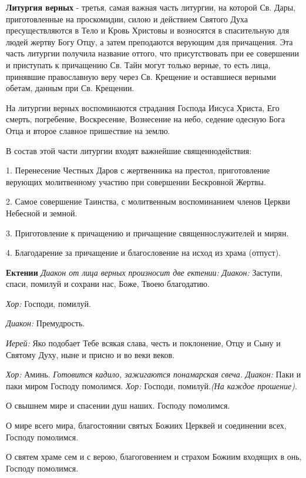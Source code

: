 {\bfseries Литургия верных} - третья, самая важная часть литургии, на которой Св. Дары, приготовленные на проскомидии, силою и действием Святого Духа пресуществляются в Тело и Кровь Христовы и возносятся в спасительную для людей жертву Богу Отцу, а затем преподаются верующим для причащения. Эта часть литургии получила название оттого, что присутствовать при ее совершении и приступать к причащению Св. Тайн могут только верные, то есть лица, принявшие православную веру через Св. Крещение и оставшиеся верными обетам, данным при Св. Крещении.

  На литургии верных воспоминаются страдания Господа Иисуса Христа, Его смерть, погребение, Воскресение, Вознесение на небо, седение одесную Бога Отца и второе славное пришествие на землю.

В состав этой части литургии входят важнейшие священнодействия:

  1. Перенесение Честных Даров с жертвенника на престол, приготовление верующих молитвенному участию при совершении Бескровной Жертвы.

  2. Самое совершение Таинства, с молитвенным воспоминанием членов Церкви Небесной и земной. 

  3. Приготовление к причащению и причащение священнослужителей и мирян.

  4. Благодарение за причащение и благословение на исход из храма (отпуст).

 {\bfseries Ектении}
{\itshape Диакон от лица верных произносит две ектении:}
 {\itshape  Диакон:} Заступи, спаси, помилуй и сохрани нас, Боже, Твоею благодатию.

{\itshape Хор:} Господи, помилуй.

{\itshape Диакон:} Премудрость.

{\itshape  Иерей:} Яко подобает Тебе всякая слава, честь и поклонение, Отцу и Сыну и Святому Духу, ныне и присно и во веки веков.

{\itshape  Хор:} Аминь.
{\itshape  Готовится кадило, зажигаются понамарская свеча.}
 {\itshape  Диакон:} Паки и паки миром Господу помолимся. 
{\itshape  
  Хор:} Господи, помилуй.{\itshape  (На каждое прошение)}. 

  О свышнем мире и спасении душ наших. Господу помолимся. 

  О мире всего мира, благостоянии святых Божиих Церквей и соединении всех, Господу помолимся. 

  О святем храме сем и с верою, благоговением и страхом Божиим входящих в онь, Господу помолимся. 

